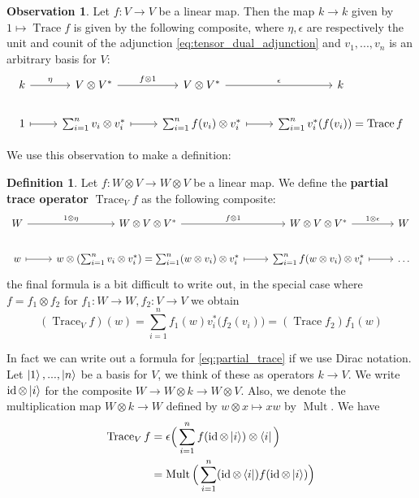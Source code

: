 \documentclass[12pt]{article}
\theoremstyle{plain}
\theoremstyle{definition}
\newtheorem{defn}[thm]{Definition} %
\newtheorem{observation}[thm]{Observation}
\newcommand{\lto}{\longrightarrow}
\begin{document}
	\begin{observation}
		Let $f: V \lto V$ be a linear map. Then the map $k \lto k$ given by $1 \longmapsto \operatorname{Trace}f$ is given by the following composite, where $\eta,\epsilon$ are respectively the unit and counit of the adjunction \eqref{eq:tensor_dual_adjunction} and $v_1,...,v_n$ is an arbitrary basis for $V$:
		\begin{equation}
			\begin{tikzcd}
				k\arrow[r,"{\eta}"] & V \otimes V^\ast\arrow[r, "{f \otimes 1}"] & V \otimes V^\ast\arrow[r,"{\epsilon}"] & k\\
				1\arrow[r,mapsto] & \sum_{i = 1}^n v_i \otimes v_i^\ast\arrow[r,mapsto] & \sum_{i = 1}^n f(v_i) \otimes v_i^\ast\arrow[r,mapsto] & \sum_{i = 1}^n v_i^{\ast}(f(v_i)) = \operatorname{Trace}f
			\end{tikzcd}
		\end{equation}
	\end{observation}
	We use this observation to make a definition:
	\begin{defn}
		Let $f: W \otimes V \lto W \otimes V$ be a linear map. We define the \textbf{partial trace operator} $\operatorname{Trace}_Vf$ as the following composite:
		\begin{equation}\label{eq:partial_trace}
			\begin{tikzcd}
				W\arrow[r,"{1 \otimes \eta}"] & W \otimes V \otimes V^\ast\arrow[r,"{f \otimes 1}"] & W \otimes V \otimes V^\ast\arrow[r,"{1 \otimes \epsilon}"] & W\\
				w\arrow[r,mapsto] & w \otimes (\sum_{i = 1}^n v_i \otimes v_i^\ast) = \sum_{i = 1}^n(w \otimes v_i) \otimes v_i^\ast\arrow[r,mapsto] & \sum_{i = 1}^n f(w \otimes v_i) \otimes v_i^\ast\arrow[r,mapsto] & \hdots
			\end{tikzcd}
		\end{equation}
		the final formula is a bit difficult to write out, in the special case where $f = f_1 \otimes f_2$ for $f_1: W \lto W, f_2: V \lto V$ we obtain
		\begin{equation}
			(\operatorname{Trace}_Vf)(w) = \sum_{i = 1}^n f_1(w)v_i^\ast\big(f_2(v_i)\big) = (\operatorname{Trace}f_2)f_1(w)
		\end{equation}
	\end{defn}
	In fact we can write out a formula for \eqref{eq:partial_trace} if we use Dirac notation. Let $\ket{1},...,\ket{n}$ be a basis for $V$, we think of these as operators $k \lto V$.  We write $\operatorname{id} \otimes \ket{i}$ for the composite $W \lto W \otimes k \lto W \otimes V$.  Also, we denote the multiplication map $W \otimes k \lto W$ defined by $w \otimes x \longmapsto xw$ by $\operatorname{Mult}$. We have
	\begin{align*}
		\operatorname{Trace}_V f &= \epsilon\Big(\sum_{i = 1}^n f(\operatorname{id} \otimes \ket{i}) \otimes \bra{i}\Big)\\
		&= \operatorname{Mult}\Big(\sum_{i = 1}^n (\operatorname{id} \otimes \bra{i})f (\operatorname{id} \otimes \ket{i})\Big)
	\end{align*}
	
\end{document}
